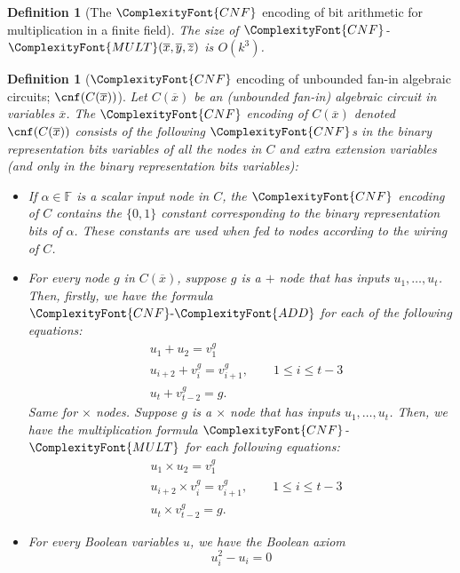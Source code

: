 \documentclass[11pt,letter]{article}
\newtheorem{definition}[theorem]{Definition}
\theoremstyle{remark} %
\newcommand{\CNF}{ %
    {
        \ComplexityFont{CNF}
    }
}
\newcommand{\add}{ %
    {
        \ComplexityFont{ADD}
    }
}
\newcommand{\mult}{ %
    {
        \ComplexityFont{MULT}
    }
}
\begin{document}
{\begin{definition}[The $\CNF$ encoding of bit arithmetic for multiplication in a finite field]
        The size of $\CNF$-$\mult(\overline{x},\overline{y},\overline{z})$ is $O(k^3)$.
    \end{definition}
    \begin{definition}[$\CNF$ encoding of unbounded fan-in algebraic circuits; $\cnf(C(\overline{x}))$] 
        \label{def: cnf encoding of algebraic circuit}
        Let $C(\overline{x})$ be an (unbounded fan-in) algebraic circuit in variables $\overline{x}$. The $\CNF$ encoding of $C(\overline{x})$ denoted $\cnf(C(\overline{x}))$ consists of the following $\CNF$s in the binary representation bits variables of all the nodes in $C$ and extra extension variables (and only in the binary representation bits variables):
        \begin{itemize}
            \item If $\alpha \in \mathbb{F}$ is a scalar input node in $C$, the $\CNF$ encoding of $C$ contains the $\{0,1\}$ constant corresponding to the binary representation bits of $\alpha$. These constants are used when fed to nodes according to the wiring of $C$.
            \item For every node $g$ in $C(\overline{x})$, suppose $g$ is a $+$ node that has inputs $u_1, \dots, u_t$. Then, firstly, we have the formula $\CNF\text{-}\add$ for each of the following equations:
            \begin{align*}
                &u_1+ u_2 = v_1^g \\
                &u_{i+2} + v_{i}^g = v_{i+1}^g, \qquad 1 \leq i \leq t-3 \\
                &u_{t} + v_{t-2}^g = g.
            \end{align*}
            Same for $\times$ nodes. Suppose $g$ is a $\times$ node that has inputs $u_1, \dots, u_t$. Then, we have the multiplication formula $\CNF$-$\mult$ for each following equations:
            \begin{align*}
                &u_1\times u_2 = v_1^g \\
                &u_{i+2} \times v_{i}^g = v_{i+1}^g, \qquad 1 \leq i \leq t-3 \\
                &u_{t} \times v_{t-2}^g = g.
            \end{align*}
            \item For every Boolean variables $u$, we have the Boolean axiom
            \begin{equation*}
                u_i^2 - u_i =0
            \end{equation*}
        \end{itemize}
        

\end{definition}}
\end{document}

